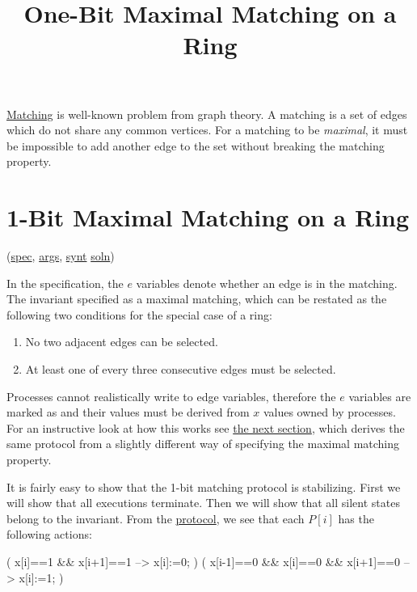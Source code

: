 
\title{One-Bit Maximal Matching on a Ring}
\date{}



\href{http://en.wikipedia.org/wiki/Matching_(graph_theory)}{Matching} is well-known problem from graph theory.
A matching is a set of edges which do not share any common vertices.
For a matching to be \textit{maximal}, it must be impossible to add another edge to the set without breaking the matching property.

\tableofcontents

\section{1-Bit Maximal Matching on a Ring}
\label{sec:MatchRing}

(\href{\examplespec/MatchRing.prot}{spec},
\href{\examplesett/MatchRing.args}{args},
\href{\examplesynt/MatchRing.prot}{synt}
\href{\examplesoln/MatchRingOneBit.prot}{soln})

In the specification, the $e$ variables denote whether an edge is in the matching.
The invariant specified as a maximal matching, which can be restated as the following two conditions for the special case of a ring:
\begin{enumerate}
\item No two adjacent edges can be selected.
\item At least one of every three consecutive edges must be selected.
\end{enumerate}

Processes cannot realistically write to edge variables, therefore the $e$ variables are marked as  and their values must be derived from $x$ values owned by processes.
For an instructive look at how this works see \href{#sec:MatchRingOneBit}{the next section}, which derives the same protocol from a slightly different way of specifying the maximal matching property.

It is fairly easy to show that the 1-bit matching protocol is stabilizing.
First we will show that all executions terminate.
Then we will show that all silent states belong to the invariant.
From the \href{\examplesoln/MatchRingOneBit.prot}{protocol}, we see that each $P[i]$ has the following actions:
\begin{code}
(              x[i]==1 && x[i+1]==1 --> x[i]:=0; )
( x[i-1]==0 && x[i]==0 && x[i+1]==0 --> x[i]:=1; )
\end{code}

